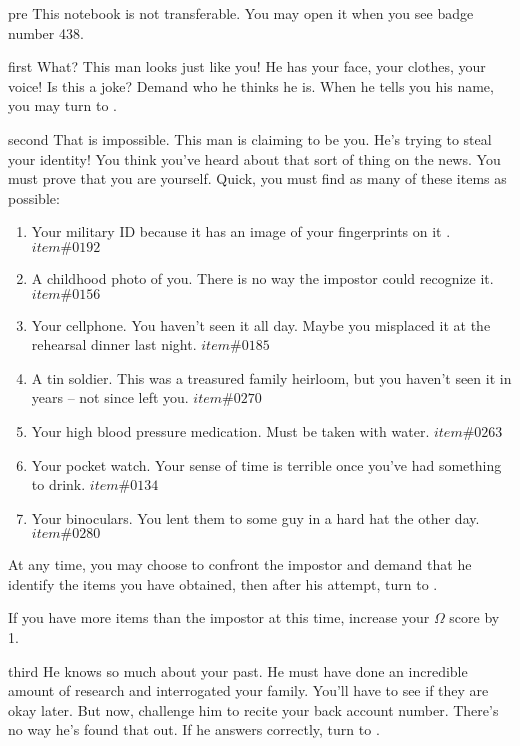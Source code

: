 \documentclass[notebook]{guildcamp1}
\begin{document}
\startnotebook{\nGroomHuntB{}}

\begin{page}{pre}
This notebook is not transferable. You may open it when you see badge number 438.
\end{page}

\begin{page}{first}
What? This man looks just like you! He has your face, your clothes, your voice! Is this a joke? Demand who he thinks he is. When he tells you his name, you may turn to .
\end{page}

\begin{page}{second}
That is impossible. This man is claiming to be you. He's trying to steal your identity! You think you've heard about that sort of thing on the news. You must prove that you are yourself. Quick, you must find as many of these items as possible:
 
 \begin{enumerate} 
\item  Your military ID because it has an image of your fingerprints on it . \(item \# 0192\)
\item  A childhood photo of you. There is no way the impostor could recognize it. \(item \# 0156\)
\item  Your cellphone. You haven't seen it all day. Maybe you misplaced it at the rehearsal dinner last night. \(item \# 0185\)
\item  A tin soldier. This was a treasured family heirloom, but you haven't seen it in years -- not since \cScientist{} left you. \(item \# 0270\)
\item  Your high blood pressure medication. Must be taken with water. \(item \# 0263\)
\item  Your pocket watch. Your sense of time is terrible once you've had something to drink. \(item \# 0134\)
\item  Your binoculars. You lent them to some guy in a hard hat the other day. \(item \# 0280\)
\end{enumerate}

  At any time, you may choose to confront the impostor and demand that he identify the items you have obtained, then after his attempt, turn to .
  
  If you have more items than the impostor at this time, increase your $\Omega$ score by 1.
\end{page}

\begin{page}{third}
He knows so much about your past. He must have done an incredible amount of research and interrogated your family. You'll have to see if they are okay later. But now, challenge him to recite your back account number.  There's no way he's found that out. If he answers correctly, turn to  .
\end{page}
\end{document}
